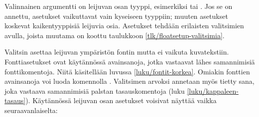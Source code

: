 
\noindent
Valinnainen argumentti  on leijuvan osan tyyppi,
esimerkiksi  tai . Jos se on annettu,
asetukset vaikuttavat vain kyseiseen tyyppiin; muuten asetukset koskevat
kaikentyyppisiä leijuvia osia. Asetukset tehdään erilaisten valitsimien
avulla, joista muutama on koottu taulukkoon
\ref{tlk/floatsetup-valitsimia}.

Valitsin  asettaa leijuvan ympäristön fontin mutta ei
vaikuta kuvatekstiin. Fonttiasetukset ovat käytännössä avainsanoja,
jotka vastaavat lähes samannimisiä fonttikomentoja. Niitä käsitellään
luvussa \ref{luku/fontit-korkea}. Omiakin fonttien avainsanoja voi luoda
komennolla . Valitsimen 
arvoksi annetaan myös tietty sana, joka vastaava samannimisiä palstan
tasauskomentoja (luku \ref{luku/kappaleen-tasaus}). Käytännössä leijuvan
osan asetukset voisivat näyttää vaikka seuraavanlaiselta:

